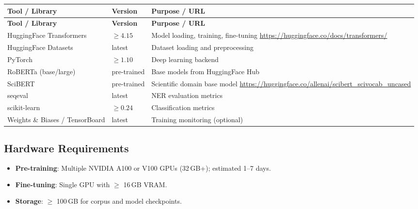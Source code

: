\documentclass[11pt,a4paper]{article}
\begin{document}
\begin{longtable}{p{4.5cm} p{2.5cm} p{6.5cm}}
\toprule
\textbf{Tool / Library} & \textbf{Version} & \textbf{Purpose / URL} \\
\midrule
\endfirsthead
\toprule
\textbf{Tool / Library} & \textbf{Version} & \textbf{Purpose / URL} \\
\midrule
\endhead
HuggingFace Transformers & $\geq 4.15$ & Model loading, training, fine-tuning \newline \url{https://huggingface.co/docs/transformers/} \\
\midrule
HuggingFace Datasets & latest & Dataset loading and preprocessing \\
\midrule
PyTorch & $\geq 1.10$ & Deep learning backend \\
\midrule
RoBERTa (base/large) & pre-trained & Base models from HuggingFace Hub \\
\midrule
SciBERT & pre-trained & Scientific domain base model \newline \url{https://huggingface.co/allenai/scibert_scivocab_uncased} \\
\midrule
seqeval & latest & NER evaluation metrics \\
\midrule
scikit-learn & $\geq 0.24$ & Classification metrics \\
\midrule
Weights \& Biases / TensorBoard & latest & Training monitoring (optional) \\
\bottomrule
\end{longtable}

\subsection{Hardware Requirements}
\begin{itemize}
  \item \textbf{Pre-training}: Multiple NVIDIA A100 or V100 GPUs (32\,GB+); estimated 1--7 days.
  \item \textbf{Fine-tuning}: Single GPU with $\geq$ 16\,GB VRAM.
  \item \textbf{Storage}: $\geq$ 100\,GB for corpus and model checkpoints.
\end{itemize}
\end{document}
